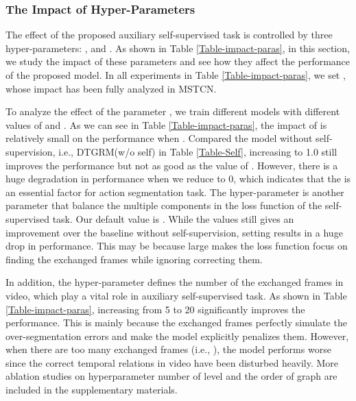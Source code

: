 \documentclass[letterpaper]{article} \usepackage{aaai21}  \usepackage{times}  \usepackage{helvet} \usepackage{courier}  \usepackage[hyphens]{url}  \usepackage{graphicx} \usepackage{mathtools}
\begin{document}
\subsubsection{The Impact of Hyper-Parameters}
The effect of the proposed auxiliary self-supervised task is controlled by three hyper-parameters: ,  and . As shown in Table \ref{Table-impact-paras}, in this section, we study the impact of these parameters and see how they affect the performance of the proposed model. In all experiments in Table \ref{Table-impact-paras}, we set , whose impact has been fully analyzed in MSTCN.

To analyze the effect of the parameter , we train different models with different values of  and . As we can see in Table \ref{Table-impact-paras}, the impact of  is relatively small on the performance when . Compared the model without self-supervision, i.e., DTGRM(w/o self) in Table \ref{Table-Self}, increasing  to 1.0 still improves the performance but not as good as the value of . However, there is a huge degradation in performance when we reduce  to 0, which indicates that the  is an essential factor for action segmentation task. The hyper-parameter  is another parameter that balance the multiple components in the loss function of the self-supervised task. Our default value is . While the values  still gives an improvement over the baseline without self-supervision, setting  results in a huge drop in performance. This may be because large  makes the loss function focus on finding the exchanged frames while ignoring correcting them.

In addition, the hyper-parameter  defines the number of the exchanged frames in video, which play a vital role in auxiliary self-supervised task. As shown in Table \ref{Table-impact-paras}, increasing  from 5 to 20 significantly improves the performance. This is mainly because the exchanged frames perfectly simulate the over-segmentation errors and make the model explicitly penalizes them. However, when there are too many exchanged frames (i.e., ), the model performs worse since the correct temporal relations in video have been disturbed heavily. More ablation studies on hyperparameter number of level  and the order of graph  are included in the supplementary materials.
\end{document}

